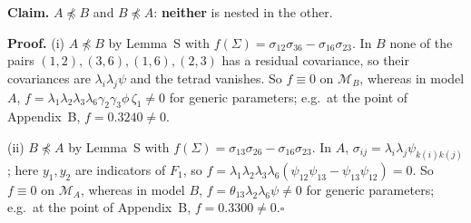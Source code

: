 \documentclass[10pt,a4paper]{article}
\newcommand{\nnest}{\not\preceq}
\begin{document}
\par\bigskip
\noindent\textbf{Claim.} $A \nnest B$ and $B \nnest A$: \textbf{neither} is nested in the other.\par\smallskip
\noindent\textbf{Proof.} (i) $A\nnest B$ by Lemma~S with $f(\Sigma)=\sigma_{12}\sigma_{36} - \sigma_{16}\sigma_{23}$. In $B$ none of the pairs $(1,2),(3,6),(1,6),(2,3)$ has a residual covariance, so their covariances are $\lambda_i\lambda_j\psi$ and the tetrad vanishes. So $f\equiv0$ on $\mathcal M_B$, whereas in model $A$, $f=\lambda_1\lambda_2\lambda_3\lambda_6\gamma_2\gamma_3\phi\,\zeta_1\neq0$ for generic parameters; e.g.\ at the point of Appendix~B, $f=0.3240\neq0$.\par\smallskip
\noindent(ii) $B\nnest A$ by Lemma~S with $f(\Sigma)=\sigma_{13}\sigma_{26} - \sigma_{16}\sigma_{23}$. In $A$, $\sigma_{ij}=\lambda_i\lambda_j\psi_{k(i)k(j)}$; here $y_1,y_2$ are indicators of $F_1$, so $f=\lambda_1\lambda_2\lambda_3\lambda_6(\psi_{12}\psi_{13}-\psi_{13}\psi_{12})=0$. So $f\equiv0$ on $\mathcal M_A$, whereas in model $B$, $f=\theta_{13}\lambda_2\lambda_6\psi\neq0$ for generic parameters; e.g.\ at the point of Appendix~B, $f=0.3300\neq0$.\hfill$\square$\par\medskip
{}

\clearpage
\end{document}
